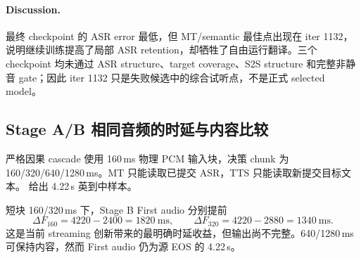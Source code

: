 \documentclass[11pt,a4paper]{article}
\begin{document}
\paragraph{Discussion.}
最终 checkpoint 的 ASR error 最低，但 MT/semantic 最佳点出现在 iter 1132，说明继续训练提高了局部 ASR retention，却牺牲了自由运行翻译。三个 checkpoint 均未通过 ASR structure、target coverage、S2S structure 和完整非静音 gate；因此 iter 1132 只是失败候选中的综合试听点，不是正式 selected model。

\subsection{Stage A/B 相同音频的时延与内容比较}

严格因果 cascade 使用 160\,ms 物理 PCM 输入块，决策 chunk 为 160/320/640/1280\,ms。MT 只能读取已提交 ASR，TTS 只能读取新提交目标文本。 给出 4.22\,s 英到中样本。

\begin{table}[H]
\centering
\caption{英到中：Stage A/B 的 First audio 与内容。单位均为 ms；LAAL 为 proxy。}
\label{tab:en2zh_latency}
\end{table}

短块 160/320\,ms 下，Stage B First audio 分别提前
\begin{equation}
 \Delta F_{160}=4220-2400=1820\ \mathrm{ms},\qquad
 \Delta F_{320}=4220-2880=1340\ \mathrm{ms}.
 \label{eq:firstaudio_gain}
\end{equation}
这是当前 streaming 创新带来的最明确时延收益，但输出尚不完整。640/1280\,ms 可保持内容，然而 First audio 仍为源 EOS 的 4.22\,s。
\end{document}
